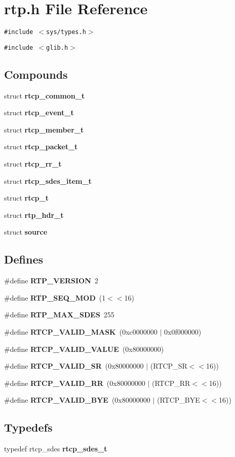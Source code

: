 \section{rtp.h File Reference}
\label{rtp_8h}
{\tt \#include $<$sys/types.h$>$}\par
{\tt \#include $<$glib.h$>$}\par
\subsection*{Compounds}
\begin{CompactItemize}
\item 
struct {\bf rtcp\_\-common\_\-t}
\item 
struct {\bf rtcp\_\-event\_\-t}
\item 
struct {\bf rtcp\_\-member\_\-t}
\item 
struct {\bf rtcp\_\-packet\_\-t}
\item 
struct {\bf rtcp\_\-rr\_\-t}
\item 
struct {\bf rtcp\_\-sdes\_\-item\_\-t}
\item 
struct {\bf rtcp\_\-t}
\item 
struct {\bf rtp\_\-hdr\_\-t}
\item 
struct {\bf source}
\end{CompactItemize}
\subsection*{Defines}
\begin{CompactItemize}
\item 
\#define {\bf RTP\_\-VERSION}\ 2
\item 
\#define {\bf RTP\_\-SEQ\_\-MOD}\ (1$<$$<$16)
\item 
\#define {\bf RTP\_\-MAX\_\-SDES}\ 255
\item 
\#define {\bf RTCP\_\-VALID\_\-MASK}\ (0xc0000000 $|$ 0x0f000000)
\item 
\#define {\bf RTCP\_\-VALID\_\-VALUE}\ (0x80000000)
\item 
\#define {\bf RTCP\_\-VALID\_\-SR}\ (0x80000000 $|$ (RTCP\_\-SR$<$$<$16))
\item 
\#define {\bf RTCP\_\-VALID\_\-RR}\ (0x80000000 $|$ (RTCP\_\-RR$<$$<$16))
\item 
\#define {\bf RTCP\_\-VALID\_\-BYE}\ (0x80000000 $|$ (RTCP\_\-BYE$<$$<$16))
\end{CompactItemize}
\subsection*{Typedefs}
\begin{CompactItemize}
\item 
typedef rtcp\_\-sdes {\bf rtcp\_\-sdes\_\-t}
\end{CompactItemize}

